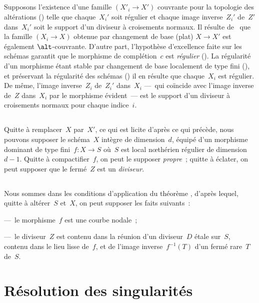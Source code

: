 \documentclass[10pt]{smfart}
\begin{document}
\subsection{}Supposons l'existence d'une famille $(X′_i → X′)$
couvrante pour la topologie des altérations ()
telle que chaque $X_i′$ soit régulier et chaque image inverse $Z_i ′$
de $Z′$ dans $X_i′$ soit le support d'un diviseur à croisements
normaux. Il résulte de 
que la famille $(X_i → X)$ obtenue par changement de base
(plat) $X → X′$ est également $\alt$-couvrante.
D'autre part, l'hypothèse d'excellence faite sur les schémas
garantit que le morphisme de complétion $c$ est \emph{régulier}
().
La régularité d'un morphisme étant stable par changement de base
localement de type fini (),
et préservant la régularité des schémas ()
il en résulte que chaque $X_i$ est régulier. De même, l'image
inverse $Z_i$ de $Z_i′$ dans $X_i$ — qui coïncide
avec l'image inverse de $Z$ dans $X_i$ par le morphisme
évident — est le support d'un diviseur à croisements normaux
pour chaque indice $i$. 

\subsection{}Quitte à remplacer $X$ par $X′$, ce
qui est licite d'après ce qui précède, nous pouvons
supposer le schéma $X$ intègre de dimension $d$,
équipé d'un morphisme dominant de type fini $f:X → S$ où $S$
est local nœthérien régulier de dimension $d-1$.
Quitte à compactifier $f$, on peut le supposer \emph{propre} ;
quitte à éclater, on peut supposer que le fermé $Z$ est un
\emph{diviseur}.

\subsection{}
Nous sommes dans les conditions d'application
du théorème \cite[2.4]{Families@de_Jong},
d'après lequel, quitte à altérer $S$ et $X$, on peut supposer les faits suivants :

— le morphisme $f$ est une courbe nodale ;

— le diviseur $Z$ est contenu dans la réunion
d'un diviseur $D$ étale sur $S$, contenu dans le lieu
lisse de $f$, et de l'image inverse $f^{-1}(T)$ d'un
fermé rare $T$ de $S$.

\section{Résolution des singularités}
\label{7-utilisation log-résolution}
\end{document}
